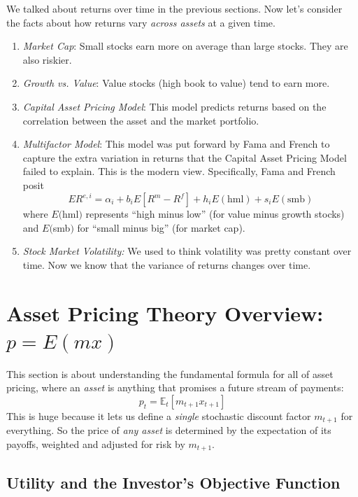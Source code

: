 \documentclass[a4paper,12pt]{scrartcl}
\begin{document}
We talked about returns over time in the previous sections. Now
let's consider the facts about how returns vary \emph{across assets}
at a given time.
\begin{enumerate}
    \item {\sl Market Cap}: Small stocks earn more on average than
	large stocks.  They are also riskier.
    \item {\sl Growth vs. Value}: Value stocks (high book to value)
	tend to earn more.
    \item {\sl Capital Asset Pricing Model}: This model predicts
	returns based on the correlation between the asset and
	the market portfolio.
    \item {\sl Multifactor Model}: This model was put forward by
	Fama and French to capture the extra variation in returns
	that the Capital Asset Pricing Model failed to explain.
	This is the modern view. Specifically, Fama and French posit
	\begin{equation}
	    \label{ff3fm}
	    ER^{e,i} = \alpha_i + b_iE[R^m - R^f] + h_i E(\text{hml})
		+ s_i E(\text{smb})
	\end{equation}
	where $E($hml$)$ represents ``high minus low'' (for
	value minus growth stocks)
	and $E($smb$)$ for ``small minus big'' (for market cap).
    \item {\sl Stock Market Volatility:} We used to think volatility
	was pretty constant over time.  Now we know that the
	variance of returns changes over time.
\end{enumerate}

\clearpage
\section{Asset Pricing Theory Overview: $p=E(mx)$}

This section is about understanding the fundamental formula for
all of asset pricing, where an \emph{asset} is anything
that promises a future stream of payments:
\begin{equation}
    \label{pemx}
    p_t = \mathbb{E}_t[m_{t+1} x_{t+1}]
\end{equation}
This is huge because it lets us define a \emph{single} stochastic
discount factor $m_{t+1}$ for everything. So the price of \emph{any
asset} is determined by the expectation of its payoffs, weighted and
adjusted for risk by $m_{t+1}$.

\subsection{Utility and the Investor's Objective Function}
\end{document}
